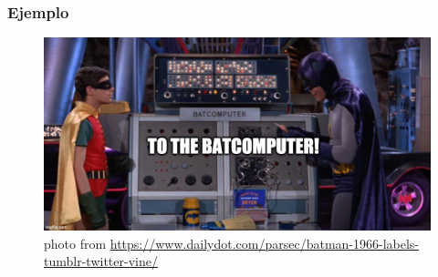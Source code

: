 \documentclass[
  shownotes,
  xcolor={svgnames},
  hyperref={colorlinks,citecolor=DarkBlue,linkcolor=andesred,urlcolor=DarkBlue}
  , aspectratio=169]{beamer}
\begin{document}
\begin{frame}[fragile]
\frametitle{Ejemplo}
\begin{figure}[H] \centering
  \centering
  \includegraphics[scale=0.35]{figures/baticomputer_meme.jpg}
  \\
  \tiny photo from \url{https://www.dailydot.com/parsec/batman-1966-labels-tumblr-twitter-vine/}
\end{figure}

\end{frame}

\end{document}
